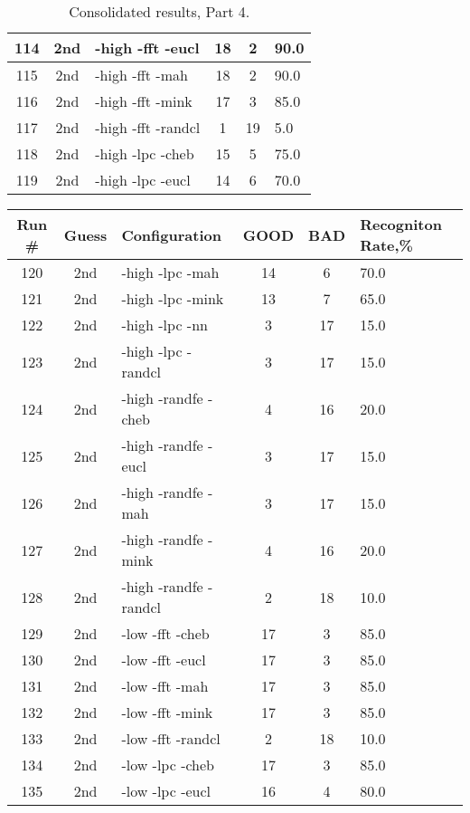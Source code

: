 \begin{table}
\begin{tabular}{|c|c|l|c|c|l|}
114 & 2nd & -high -fft -eucl & 18 & 2 & 90.0\\ \hline
115 & 2nd & -high -fft -mah & 18 & 2 & 90.0\\ \hline
116 & 2nd & -high -fft -mink & 17 & 3 & 85.0\\ \hline
117 & 2nd & -high -fft -randcl & 1 & 19 & 5.0\\ \hline
118 & 2nd & -high -lpc -cheb & 15 & 5 & 75.0\\ \hline
119 & 2nd & -high -lpc -eucl & 14 & 6 & 70.0\\ \hline
\end{tabular}
\caption{Consolidated results, Part 4.}
\label{tab:results}
\end{table}

\begin{table}
\centering
\begin{tabular}{|c|c|l|c|c|l|} \hline
Run \# & Guess & Configuration & GOOD & BAD & Recogniton Rate,\%\\ \hline\hline
120 & 2nd & -high -lpc -mah & 14 & 6 & 70.0\\ \hline
121 & 2nd & -high -lpc -mink & 13 & 7 & 65.0\\ \hline
122 & 2nd & -high -lpc -nn & 3 & 17 & 15.0\\ \hline
123 & 2nd & -high -lpc -randcl & 3 & 17 & 15.0\\ \hline
124 & 2nd & -high -randfe -cheb & 4 & 16 & 20.0\\ \hline
125 & 2nd & -high -randfe -eucl & 3 & 17 & 15.0\\ \hline
126 & 2nd & -high -randfe -mah & 3 & 17 & 15.0\\ \hline
127 & 2nd & -high -randfe -mink & 4 & 16 & 20.0\\ \hline
128 & 2nd & -high -randfe -randcl & 2 & 18 & 10.0\\ \hline
129 & 2nd & -low -fft -cheb & 17 & 3 & 85.0\\ \hline
130 & 2nd & -low -fft -eucl & 17 & 3 & 85.0\\ \hline
131 & 2nd & -low -fft -mah & 17 & 3 & 85.0\\ \hline
132 & 2nd & -low -fft -mink & 17 & 3 & 85.0\\ \hline
133 & 2nd & -low -fft -randcl & 2 & 18 & 10.0\\ \hline
134 & 2nd & -low -lpc -cheb & 17 & 3 & 85.0\\ \hline
135 & 2nd & -low -lpc -eucl & 16 & 4 & 80.0\\ \hline

\end{tabular}
\end{table}
